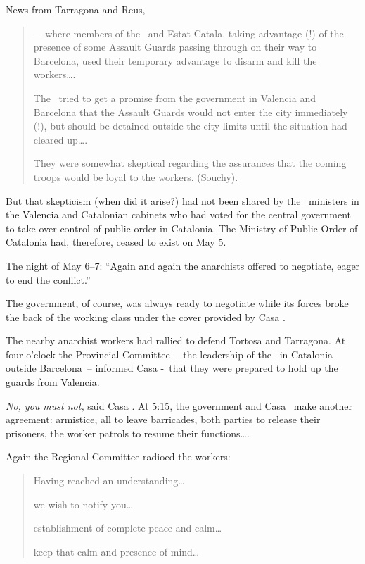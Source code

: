 \smallskip

News from Tarragona and Reus,

\begin{quotation}
  \noindent
  —\,where members of the \PSUC\ and Estat Catala, taking advantage (!) of the presence of some Assault Guards passing through on their way to Barcelona, used their temporary advantage to disarm and kill the workers\dots.
  
  The \CNT\ tried to get a promise from the government in Valencia and Barcelona that the Assault Guards would not enter the city immediately (!), but should be detained outside the city limits until the situation had cleared up\dots.
  
  They were somewhat skeptical regarding the assurances that the coming troops would be loyal to the workers. (Souchy).
\end{quotation}

But that skepticism (when did it arise?) had not been shared by the \CNT\ ministers in the Valencia and Catalonian cabinets who had voted for the central government to take over control of public order in Catalonia. The Ministry of Public Order of Catalonia had, therefore, ceased to exist on May 5.

The night of May 6–7: ``Again and again the anarchists offered to negotiate, eager to end the conflict.''

The government, of course, was always ready to negotiate while its forces broke the back of the working class under the cover provided by Casa \CNT\kn.

The nearby anarchist workers had rallied to defend Tortosa and Tarragona. At four o’clock the Provincial Committee~-- the leadership of the \CNT\ in Catalonia outside Barcelona~-- informed Casa \CNT-\FAI\ that they were prepared to hold up the guards from Valencia.

\emph{No, you must not,} said Casa \CNT\kn. At 5:15, the government and Casa \CNT\ make another agreement: armistice, all to leave barricades, both parties to release their prisoners, the worker patrols to resume their functions\dots.

Again the Regional Committee radioed the workers:

\begin{quotation}
  Having reached an understanding\dots
  
  we wish to notify you\dots
  
  establishment of complete peace and calm\dots
  
  keep that calm and presence of mind\dots
\end{quotation}

